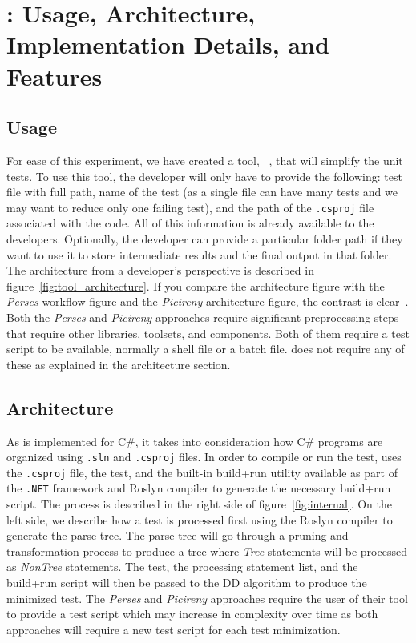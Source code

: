 \clearpage %

\chapter{\mytool: Usage, Architecture, Implementation Details, and Features}\label{CH4_ToolUsage}


\section{Usage}
For ease of this experiment, we have created a tool, \mytool~\cite{weber_2022}, that will simplify the unit tests. To use this tool, the developer will only have to provide the following: test file with full path, name of the test (as a single file can have many tests and we may want to reduce only one failing test), and the path of the \texttt{.csproj} file associated with the code. All of this information is already available to the developers. Optionally, the developer can provide a particular folder path if they want to use it to store intermediate results and the final output in that folder. The architecture from a developer's perspective is described in figure~\ref{fig:tool_architecture}. If you compare the architecture figure with the \emph{Perses} workflow figure and the \emph{Picireny} architecture figure, the contrast is clear~\cite{hodovan2016modernizing, perses}. Both the \emph{Perses} and \emph{Picireny} approaches require significant preprocessing steps that require other libraries, toolsets, and components. Both of them require a test script to be available, normally a shell file or a batch file. \mytool does not require any of these as explained in the architecture section. 

\section{Architecture}
As \mytool is implemented for C\#, it takes into consideration how C\# programs are organized using \texttt{.sln} and \texttt{.csproj} files. In order to compile or run the test, \mytool uses the \texttt{.csproj} file, the test, and the built-in build+run utility available as part of the \texttt{.NET} framework and Roslyn compiler to generate the necessary build+run script. The process is described in the right side of figure~\ref{fig:internal}. On the left side, we describe how a test is processed first using the Roslyn compiler to generate the parse tree. The parse tree will go through a pruning and transformation process to produce a tree where \emph{Tree} statements will be processed as \emph{NonTree} statements. The test, the processing statement list, and the build+run script will then be passed to the DD algorithm to produce the minimized test. The \emph{Perses} and \emph{Picireny} approaches require the user of their tool to provide a test script which may increase in complexity over time as both approaches will require a new test script for each test minimization. 


